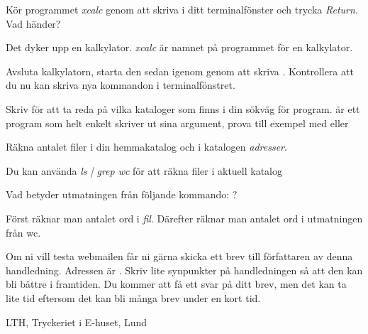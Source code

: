 \documentclass[a4paper,twocolumn]{book}
\begin{document}
\begin{exercise}
  Kör programmet \emph{xcalc} genom att skriva  i
  ditt terminalfönster och trycka \emph{Return}. Vad händer?
  \begin{answer}
    Det dyker upp en kalkylator. \emph{xcalc} är namnet på
    programmet för en kalkylator.
  \end{answer}
\end{exercise}
\begin{exercise}
  Avsluta kalkylatorn, starta den sedan
  igenom genom att skriva . Kontrollera att du
  nu kan skriva nya kommandon i terminalfönstret.
\end{exercise}

\begin{exercise}
  Skriv  för att ta reda på vilka kataloger som finns i
  din sökväg för program.  är ett program som helt
  enkelt skriver ut sina argument, prova till exempel med
   eller 
\end{exercise}

\begin{exercise}
  Räkna antalet filer i din hemmakatalog och i katalogen \emph{adresser}.
  \begin{answer}
    Du kan använda \emph{ls | grep wc} för att räkna filer i aktuell katalog
  \end{answer}
\end{exercise}
\begin{exercise}
  Vad betyder utmatningen från följande kommando: 
  \mbox{}?
  \begin{answer}
    Först räknar man antalet ord i \emph{fil}. Därefter räknar man
    antalet ord i utmatningen från wc.
  \end{answer}
\end{exercise}

\begin{exercise}
  Om ni vill testa webmailen får ni gärna skicka ett brev till
  författaren av denna handledning. Adressen är
  . Skriv lite synpunkter på handledningen så att
  den kan bli bättre i framtiden. Du kommer att få ett svar på ditt
  brev, men det kan ta lite tid eftersom det kan bli många brev under
  en kort tid.
\end{exercise}


\appendix
\answers
\label{answers}

\onecolumn
\printindex

\cleardoublepage
\thispagestyle{empty}
\hbox{}
\newpage
\onecolumn
\thispagestyle{empty}
\hbox{}\vfill\noindent\small
\centerline{LTH, Tryckeriet i E-huset, Lund \number\year{}}
\end{document}
